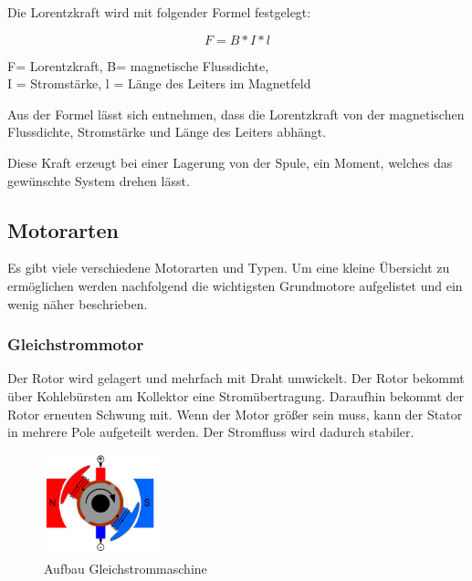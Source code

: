 Die Lorentzkraft wird mit folgender Formel festgelegt:

\begin{equation}
\label{eq:1}
 F = B * I * l
\end{equation}
\begin{center}
F= Lorentzkraft, B= magnetische Flussdichte, \\ I = Stromstärke, l = Länge des Leiters im Magnetfeld
\end{center}

Aus der Formel lässt sich entnehmen, dass die Lorentzkraft von der magnetischen Flussdichte, Stromstärke und Länge des Leiters abhängt.

Diese Kraft erzeugt bei einer Lagerung von der Spule, ein Moment, welches das gewünschte System drehen lässt.

\subsection{Motorarten}
\label{sec:motorarten}

Es gibt viele verschiedene Motorarten und Typen. Um eine kleine Übersicht zu ermöglichen werden nachfolgend die wichtigsten Grundmotore aufgelistet und ein wenig näher beschrieben.

\subsubsection{Gleichstrommotor}
\label{sec:gleichstrommotor}

Der Rotor wird gelagert und mehrfach mit Draht umwickelt. Der Rotor bekommt über Kohlebürsten am Kollektor eine Stromübertragung. Daraufhin bekommt der Rotor erneuten Schwung mit.
Wenn der Motor größer sein muss, kann der Stator in mehrere Pole aufgeteilt werden. Der Stromfluss wird dadurch stabiler.

\begin{figure}[!ht]
\begin{center}
	\caption{Aufbau Gleichstrommaschine}
	\includegraphics[width=0.3\textwidth]{Gleichstommaschine}
\end{center}
\end{figure}

